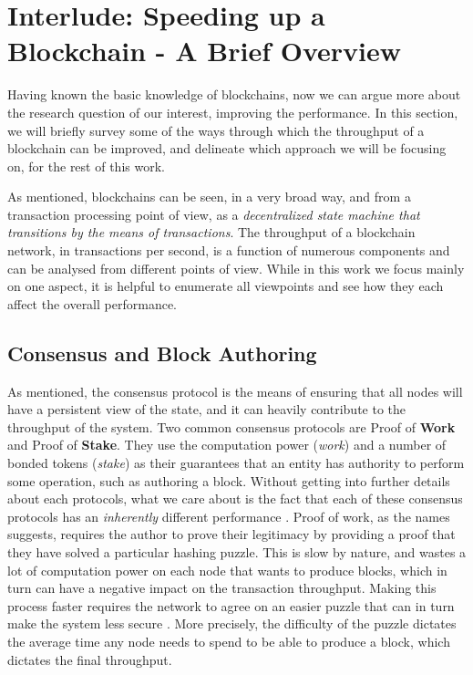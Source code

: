 \section{Interlude: Speeding up a Blockchain - A Brief Overview} \label{chap_bg:sec:ways_to_speedup}

Having known the basic knowledge of blockchains, now we can argue more about the research question
of our interest, improving the performance. In this section, we will briefly survey some of the ways
through which the throughput of a blockchain can be improved, and delineate which approach we will
be focusing on, for the rest of this work.

As mentioned, blockchains can be seen, in a very broad way, and from a transaction processing point
of view, as a \textit{decentralized state machine that transitions by the means of transactions}.
The throughput of a blockchain network, in transactions per second, is a function of numerous
components and can be analysed from different points of view. While in this work we focus mainly on
one aspect, it is helpful to enumerate all viewpoints and see how they each affect the overall
performance.

\subsection{Consensus and Block Authoring}

As mentioned, the consensus protocol is the means of ensuring that all nodes will have a persistent
view of the state, and it can heavily contribute to the throughput of the system. Two common
consensus protocols are Proof of \textbf{Work} and Proof of \textbf{Stake}. They use the computation
power (\textit{work}) and a number of bonded tokens (\textit{stake}) as their guarantees
that an entity has authority to perform some operation, such as authoring a block. Without getting
into further details about each protocols, what we care about is the fact that each of these
consensus protocols has an \textit{inherently} different performance \cite{survey_on_all}. Proof of work, as
the names suggests, requires the author to prove their legitimacy by providing a proof that they
have solved a particular hashing puzzle. This is slow by nature, and wastes a lot of computation
power on each node that wants to produce blocks, which in turn can have a negative impact on the
transaction throughput. Making this process faster requires the network to agree on an easier
puzzle that can in turn make the system less secure \cite{security_of_bitcoin}. More precisely, the
difficulty of the puzzle dictates the average time any node needs to spend to be able to produce a
block, which dictates the final throughput.

